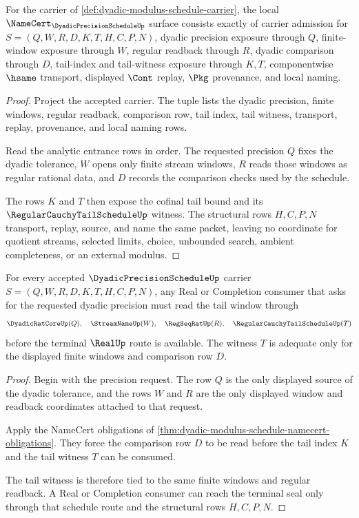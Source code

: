 \begin{theorem}
\label{thm:dyadic-modulus-schedule-namecert-obligations}
For the carrier of \autoref{def:dyadic-modulus-schedule-carrier}, the local $\NameCert_{\DyadicPrecisionScheduleUp}$ surface consists exactly of carrier admission for $S=(Q,W,R,D,K,T,H,C,P,N)$, dyadic precision exposure through $Q$, finite-window exposure through $W$, regular readback through $R$, dyadic comparison through $D$, tail-index and tail-witness exposure through $K,T$, componentwise $\hsame$ transport, displayed $\Cont$ replay, $\Pkg$ provenance, and local naming.
\end{theorem}
\begin{proof}
Project the accepted carrier. The tuple lists the dyadic precision, finite windows, regular readback, comparison row, tail index, tail witness, transport, replay, provenance, and local naming rows.

Read the analytic entrance rows in order. The requested precision $Q$ fixes the dyadic tolerance, $W$ opens only finite stream windows, $R$ reads those windows as regular rational data, and $D$ records the comparison checks used by the schedule.

The rows $K$ and $T$ then expose the cofinal tail bound and its $\RegularCauchyTailScheduleUp$ witness. The structural rows $H,C,P,N$ transport, replay, source, and name the same packet, leaving no coordinate for quotient streams, selected limits, choice, unbounded search, ambient completeness, or an external modulus.
\end{proof}

\begin{theorem}
\label{thm:dyadic-modulus-schedule-tail-window}
For every accepted $\DyadicPrecisionScheduleUp$ carrier $S=(Q,W,R,D,K,T,H,C,P,N)$, any Real or Completion consumer that asks for the requested dyadic precision must read the tail window through
$$
\DyadicRatCoreUp(Q),\quad \StreamNameUp(W),\quad \RegSeqRatUp(R),\quad \RegularCauchyTailScheduleUp(T)
$$
before the terminal $\RealUp$ route is available. The witness $T$ is adequate only for the displayed finite windows and comparison row $D$.
\end{theorem}
\begin{proof}
Begin with the precision request. The row $Q$ is the only displayed source of the dyadic tolerance, and the rows $W$ and $R$ are the only displayed window and readback coordinates attached to that request.

Apply the NameCert obligations of \autoref{thm:dyadic-modulus-schedule-namecert-obligations}. They force the comparison row $D$ to be read before the tail index $K$ and the tail witness $T$ can be consumed.

The tail witness is therefore tied to the same finite windows and regular readback. A Real or Completion consumer can reach the terminal seal only through that schedule route and the structural rows $H,C,P,N$.
\end{proof}


